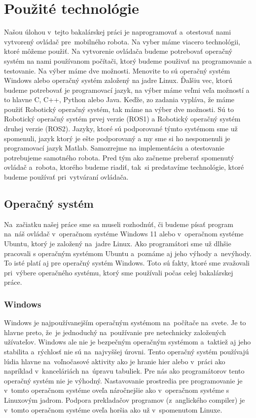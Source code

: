 \section{Použité technológie}
\label{sec:technologies}

Našou úlohou v~tejto bakalárskej práci je naprogramovať a~otestovať nami vytvorený ovládač pre~mobilného robota.
Na vyber máme viacero technológii, ktoré môžeme použiť. Na vytvorenie ovládača budeme potrebovať operačný systém
na nami používanom počítači, ktorý budeme použivať na programovanie a testovanie. Na výber máme dve možnosti.
Menovite to sú operačný systém Windows alebo operačný systém založený na jadre Linux. Ďalšiu vec, ktorú budeme
potrebovať je programovací jazyk, na výber máme veľmi veľa možností a to hlavne C, C++, Python alebo Java.
Keďže, zo zadania vypláva, že máme použiť Robotický operačný systém, tak máme na výber dve možnosti. Sú to Robotický
operačný systém prvej verzie (ROS1) a Robotický operačný systém druhej verzie (ROS2). Jazyky, ktoré sú podporované
týmto systémom sme už spomenuli, jazyk ktorý je ešte podporovaný a my sme si ho nespomenuli je programovací jazyk Matlab.
Samozrejme na implementáciu a otestovanie potrebujeme samotného robota. Pred tým ako začneme preberať spomenutý
ovládač a~robota, ktorého budeme riadiť, tak~si predstavíme technológie, ktoré budeme používať pri~vytváraní ovládača.

\subsection{Operačný systém}
\label{sec:operating_system}

Na~začiatku našej práce sme sa museli rozhodnúť, či budeme písať program na~náš ovládač v~operačnom systéme Windows 11 alebo
v~operačnom systéme Ubuntu, ktorý je založený na~jadre Linux. Ako programátori sme už dlhšie pracovali s operačným systémom
Ubuntu a~poznáme aj jeho výhody a~nevýhody. To isté platí aj pre operačný systém Windows. Toto sú fakty, ktoré sme zvažovali
pri~výbere operačného systému, ktorý sme používali počas celej bakalárskej práce.

\subsubsection{Windows}
\label{sec:windows}

Windows je najpoužívanejším operačným systémom na~počítače na~svete. Je to hlavne preto, že~je jednoduchý na~používanie
pre netechnicky založených užívateľov. Windows ale nie je bezpečným operačným systémom a~taktiež aj jeho stabilita a~rýchlosť
nie sú na~najvyššej úrovni. Tento operačný systém používajú lúdia hlavne na~voľnočasové aktivity ako je hranie hier
alebo v~práci ako napríklad v~kanceláriách na~úpravu tabuliek. Pre nás ako programátorov tento operačný systém nie je
výhodný. Nastavovanie prostredia pre programovanie je v~tomto operačnom systéme oveľa náročnejšie ako v~operačnom systéme
s Linuxovým jadrom. Podpora prekladačov programov (z~anglického compiler) je v~tomto operačnom systéme oveľa horšia
ako už v~spomenutom Linuxe.

